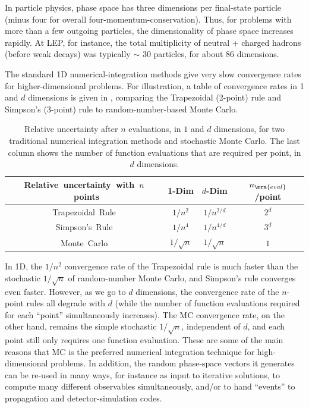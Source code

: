 In particle physics, phase space has three dimensions per final-state 
particle (minus four for overall
four-momentum-conservation). 
Thus, for problems with more than a few outgoing particles, the
dimensionality of phase space increases rapidly. 
At LEP, for instance, the total multiplicity of neutral +
charged hadrons (before weak decays) was typically $\sim$ 30 particles, 
for about 86 dimensions. 

%
%
%
The standard 1D numerical-integration methods 
give very slow convergence rates for
higher-dimensional problems. For illustration, a table of convergence
rates in 1 and $d$ dimensions is given in ,
comparing the Trapezoidal (2-point) rule and Simpson's (3-point) rule
to random-number-based Monte Carlo. 
\begin{table}[t]
\centering
{}%
%
%
\begin{tabular}{c|cc|c}
\toprule
\mbox{Relative uncertainty with $n$ points} &
1-Dim & $d$-Dim & $n_{\mrm{eval}}$/point \\
\midrule
\mbox{Trapezoidal Rule}  & $1/n^2$ & $1/n^{2/d}$ & $2^d$\\
\mbox{Simpson's Rule}  & $1/n^4$ & $1/n^{4/d}$ & $3^d$\\
\midrule
\mbox{Monte Carlo} & $1/\sqrt{n}$ & $1/\sqrt{n}$& $1$ \\
\bottomrule
\end{tabular}
\caption{Relative uncertainty after $n$ evaluations, in $1$ and $d$
dimensions, for two traditional
numerical integration methods and stochastic Monte Carlo. The 
last column shows the number of function evaluations that are
required per point, in $d$ dimensions. 
\label{tab:convergence}}
\end{table}
In 1D, the $1/n^2$ convergence rate of the 
Trapezoidal rule is much faster than the stochastic $1/\sqrt{n}$ of
random-number Monte Carlo, and
Simpson's rule converges even faster. However, as we go to 
$d$ dimensions, 
the convergence rate of the 
$n$-point rules all degrade with $d$ (while the number of function
evaluations required for each ``point'' simultaneously increases). The
MC convergence rate, on the other hand, remains the simple stochastic 
$1/\sqrt{n}$, independent of $d$, and each point still only requires
one function evaluation. 
%
These are some of
the main reasons that MC is the preferred numerical integration
technique for high-dimensional problems. In addition, the random
phase-space vectors it generates can be re-used in many ways, for
instance as input to iterative solutions, to compute many different
observables simultaneously, and/or to hand ``events'' to propagation
and detector-simulation codes. 

